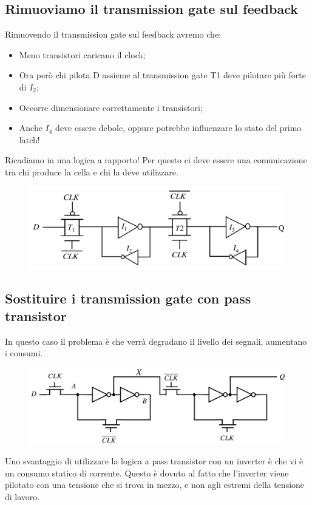 \subsection{Rimuoviamo il transmission gate sul feedback}
Rimuovendo il transmission gate sul feedback avremo che:

\begin{itemize}
    \item Meno transistori caricano il clock;
    \item Ora però chi pilota D assieme al transmission gate T1 deve pilotare più forte di $I_2$;
    \item Occorre dimensionare correttamente i transistori;
    \item Anche $I_4$ deve essere debole, oppure potrebbe influenzare lo stato del primo latch!
\end{itemize}

Ricadiamo in una logica a rapporto! Per questo ci deve essere una comunicazione tra chi produce la cella e chi la deve utilizzare.

\begin{figure}[htbp]
    \centering
    \includegraphics[width=0.6\linewidth]{img/alternativa.png}
\end{figure}

\subsection{Sostituire i transmission gate con pass transistor}

In questo caso il problema è che verrà degradano il livello dei segnali, aumentano i consumi.


\begin{figure}[htbp]
    \centering
    \includegraphics[width=0.6\linewidth]{img/alternativa2.png}
\end{figure}

Uno svantaggio di utilizzare la logica a pass transistor con un inverter è che vi è un consumo statico di corrente. Questo è dovuto al fatto che l'inverter viene pilotato con una tensione che si trova in mezzo, e non agli estremi della tensione di lavoro.

